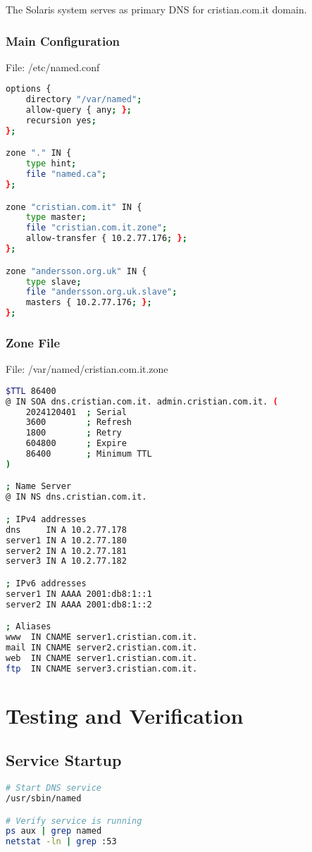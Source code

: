 \documentclass[12pt,a4paper]{article}
\begin{document}
The Solaris system serves as primary DNS for cristian.com.it domain.

\subsubsection{Main Configuration}
File: /etc/named.conf

\begin{lstlisting}[language=bash]
options {
    directory "/var/named";
    allow-query { any; };
    recursion yes;
};

zone "." IN {
    type hint;
    file "named.ca";
};

zone "cristian.com.it" IN {
    type master;
    file "cristian.com.it.zone";
    allow-transfer { 10.2.77.176; };
};

zone "andersson.org.uk" IN {
    type slave;
    file "andersson.org.uk.slave";
    masters { 10.2.77.176; };
};
\end{lstlisting}

\subsubsection{Zone File}
File: /var/named/cristian.com.it.zone

\begin{lstlisting}[language=bash]
$TTL 86400
@ IN SOA dns.cristian.com.it. admin.cristian.com.it. (
    2024120401  ; Serial
    3600        ; Refresh
    1800        ; Retry
    604800      ; Expire
    86400       ; Minimum TTL
)

; Name Server
@ IN NS dns.cristian.com.it.

; IPv4 addresses
dns     IN A 10.2.77.178
server1 IN A 10.2.77.180
server2 IN A 10.2.77.181
server3 IN A 10.2.77.182

; IPv6 addresses
server1 IN AAAA 2001:db8:1::1
server2 IN AAAA 2001:db8:1::2

; Aliases
www  IN CNAME server1.cristian.com.it.
mail IN CNAME server2.cristian.com.it.
web  IN CNAME server1.cristian.com.it.
ftp  IN CNAME server3.cristian.com.it.
\end{lstlisting}

\section{Testing and Verification}

\subsection{Service Startup}
\begin{lstlisting}[language=bash]
# Start DNS service
/usr/sbin/named

# Verify service is running
ps aux | grep named
netstat -ln | grep :53
\end{lstlisting}
\end{document}
